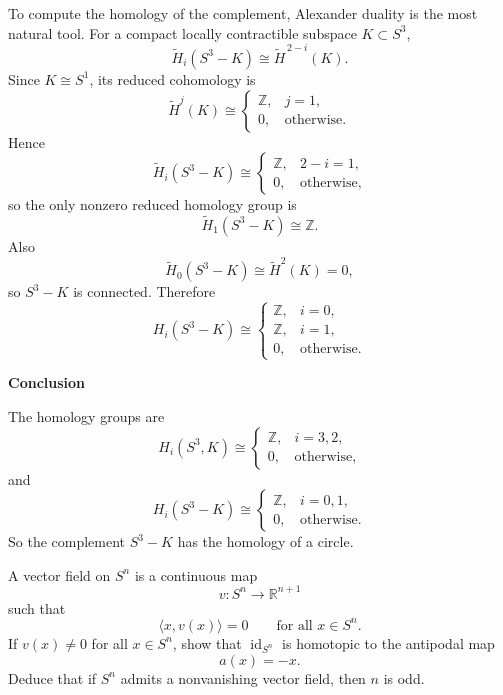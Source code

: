 \begin{solution}
To compute the homology of the complement, Alexander duality is the most natural tool. For a compact locally contractible subspace \(K\subset S^3\),
\[
\widetilde H_i(S^3-K)\cong \widetilde H^{\,2-i}(K).
\]
Since \(K\cong S^1\), its reduced cohomology is
\[
\widetilde H^j(K)\cong
\begin{cases}
	\mathbb Z, & j=1,\\
	0, & \text{otherwise}.
\end{cases}
\]
Hence
\[
\widetilde H_i(S^3-K)\cong
\begin{cases}
	\mathbb Z, & 2-i=1,\\
	0, & \text{otherwise},
\end{cases}
\]
so the only nonzero reduced homology group is
\[
\widetilde H_1(S^3-K)\cong \mathbb Z.
\]
Also
\[
\widetilde H_0(S^3-K)\cong \widetilde H^2(K)=0,
\]
so \(S^3-K\) is connected. Therefore
\[
H_i(S^3-K)\cong
\begin{cases}
	\mathbb Z, & i=0,\\[1mm]
	\mathbb Z, & i=1,\\[1mm]
	0, & \text{otherwise}.
\end{cases}
\]


\medskip
\noindent\textbf{Conclusion}\par
\smallskip


The homology groups are
\[
H_i(S^3,K)\cong
\begin{cases}
	\mathbb Z, & i=3,2,\\
	0, & \text{otherwise},
\end{cases}
\]
and
\[
H_i(S^3-K)\cong
\begin{cases}
	\mathbb Z, & i=0,1,\\
	0, & \text{otherwise}.
\end{cases}
\]
So the complement \(S^3-K\) has the homology of a circle.
\end{solution}

\begin{problem}
A vector field on \(S^n\) is a continuous map
\[
v:S^n\to \mathbb R^{n+1}
\]
such that
\[
\langle x,v(x)\rangle =0
\qquad\text{for all }x\in S^n.
\]
If \(v(x)\neq 0\) for all \(x\in S^n\), show that \(\operatorname{id}_{S^n}\) is homotopic to the antipodal map
\[
a(x)=-x.
\]
Deduce that if \(S^n\) admits a nonvanishing vector field, then \(n\) is odd.
\end{problem}

